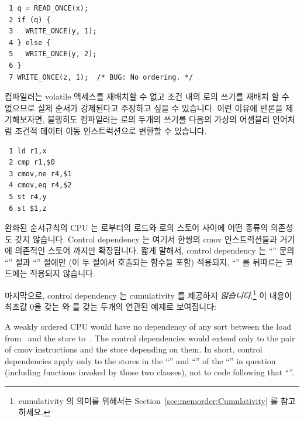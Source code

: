 \vspace{5pt}
\begin{minipage}[t]{\columnwidth}
\scriptsize
\begin{verbatim}
 1 q = READ_ONCE(x);
 2 if (q) {
 3   WRITE_ONCE(y, 1);
 4 } else {
 5   WRITE_ONCE(y, 2);
 6 }
 7 WRITE_ONCE(z, 1);  /* BUG: No ordering. */
\end{verbatim}
\end{minipage}
\vspace{5pt}

컴파일러는 volatile 액세스를 재배치할 수 없고 조건 내의  로의 쓰기를
재배치 할 수 없으므로 실제 순서가 강제된다고 주장하고 싶을 수 있습니다.
이런 이유에 반론을 제기해보자면, 불행히도 컴파일러는  로의 두개의 쓰기를
다음의 가상의 어셈블리 언어처럼 조건적 데이터 이동 인스트럭션으로 변환할 수
있습니다.

\vspace{5pt}
\begin{minipage}[t]{\columnwidth}
\scriptsize
\begin{verbatim}
 1 ld r1,x
 2 cmp r1,$0
 3 cmov,ne r4,$1
 4 cmov,eq r4,$2
 5 st r4,y
 6 st $1,z
\end{verbatim}
\end{minipage}
\vspace{5pt}

완화된 순서규칙의 CPU 는  로부터의 로드와  로의 스토어 사이에 어떤
종류의 의존성도 갖지 않습니다.
Control dependency 는 여기서 한쌍의 cmov 인스트럭션들과 거기에 의존적인 스토어
까지만 확장됩니다.
짧게 말해서, control dependency 는 ``'' 문의 ``'' 절과
``'' 절에만 (이 두 절에서 호출되는 함수들 포함) 적용되지, ``''
를 뒤따르는 코드에는 적용되지 않습니다.

마지막으로, control dependency 는 cumulativity 를 제공하지 \emph{않습니다}.\footnote{
	cumulativity 의 의미를 위해서는 Section~\ref{sec:memorder:Cumulativity}
	를 참고하세요.}
이 내용이 최초값 0을 갖는  와  를 갖는 두개의 연관된 예제로
보여집니다:
\iffalse

A weakly ordered CPU would have no dependency of any sort between the load
from~ and the store to~.
The control dependencies would extend
only to the pair of cmov instructions and the store depending on them.
In short, control dependencies apply only to the stores in the ``''
and ``'' of the ``'' in question (including functions
invoked by those two clauses), not to code following that ``''.

